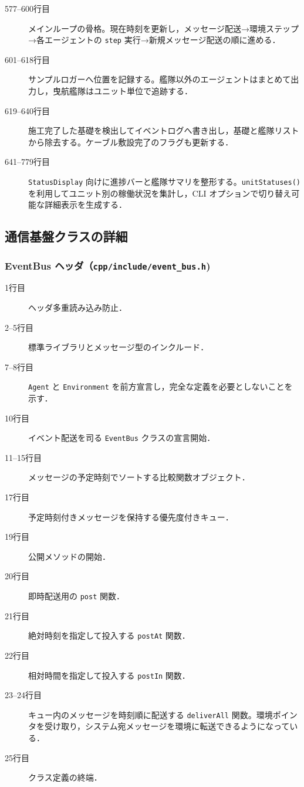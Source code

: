\documentclass[10pt,letterpaper]{jsarticle}
\begin{document}

\begin{description}
  \item[577--600行目] メインループの骨格。現在時刻を更新し，メッセージ配送→環境ステップ→各エージェントの \texttt{step} 実行→新規メッセージ配送の順に進める．
  \item[601--618行目] サンプルロガーへ位置を記録する。艦隊以外のエージェントはまとめて出力し，曳航艦隊はユニット単位で追跡する．
  \item[619--640行目] 施工完了した基礎を検出してイベントログへ書き出し，基礎と艦隊リストから除去する。ケーブル敷設完了のフラグも更新する．
  \item[641--779行目] \texttt{StatusDisplay} 向けに進捗バーと艦隊サマリを整形する。\texttt{unitStatuses()} を利用してユニット別の稼働状況を集計し，CLI オプションで切り替え可能な詳細表示を生成する．
\end{description}

\subsection{通信基盤クラスの詳細}

\subsubsection{EventBus ヘッダ（\texttt{cpp/include/event\_bus.h})}
 
\begin{description}
  \item[1行目] ヘッダ多重読み込み防止．
  \item[2--5行目] 標準ライブラリとメッセージ型のインクルード．
  \item[7--8行目] \texttt{Agent} と \texttt{Environment} を前方宣言し，完全な定義を必要としないことを示す．
  \item[10行目] イベント配送を司る \texttt{EventBus} クラスの宣言開始．
  \item[11--15行目] メッセージの予定時刻でソートする比較関数オブジェクト．
  \item[17行目] 予定時刻付きメッセージを保持する優先度付きキュー．
  \item[19行目] 公開メソッドの開始．
  \item[20行目] 即時配送用の \texttt{post} 関数．
  \item[21行目] 絶対時刻を指定して投入する \texttt{postAt} 関数．
  \item[22行目] 相対時間を指定して投入する \texttt{postIn} 関数．
  \item[23--24行目] キュー内のメッセージを時刻順に配送する \texttt{deliverAll} 関数。環境ポインタを受け取り，システム宛メッセージを環境に転送できるようになっている．
  \item[25行目] クラス定義の終端．
\end{description}
\end{document}
